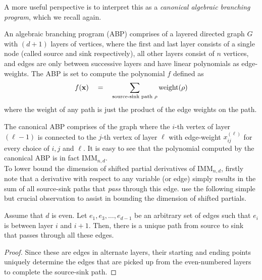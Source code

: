 A more useful perspective is to interpret this as a \emph{canonical algebraic branching program}, which we recall again. 

\begin{definition*}
An algebraic branching program (ABP) comprises of a layered directed graph $G$ with $(d+1)$ layers of vertices, where the first and last layer consists of a single node (called source and sink respectively), all other layers consist of $n$ vertices, and edges are only between successive layers and have linear polynomials as edge-weights. 
The ABP is set to compute the polynomial $f$ defined as
$$
f(\mathbf{x}) \quad = \quad \sum_{\text{source-sink path $\rho$}} \mathrm{weight}(\rho)
$$
where the $\mathrm{weight}$ of any path is just the product of the edge weights on the path. 
\end{definition*}

The canonical ABP comprises of the graph where the $i$-th vertex of layer $(\ell-1)$ is connected to the $j$-th vertex of layer $\ell$ with edge-weight $x_{ij}^{(\ell)}$ for every choice of $i,j$ and $\ell$. 
It is easy to see that the polynomial computed by the canonical ABP is in fact $\mathrm{IMM}_{n,d}$. \\

To lower bound the dimension of shifted partial derivatives of $\mathrm{IMM}_{n,d}$, firstly note that a derivative with respect to any variable (or edge) simply results in the sum of all source-sink paths that \emph{pass} through this edge. \cite{FLMS13} use the following simple but crucial observation to assist in bounding the dimension of shifted partials. 

\begin{observation}\label{obs:odd-layer-unique-path}
Assume that $d$ is even. 
Let $e_1,e_3,\dots, e_{d-1}$ be an arbitrary set of edges such that $e_i$ is between layer $i$ and $i+1$. 
Then, there is a unique path from source to sink that passes through all these edges. 
\end{observation}
\begin{proof}
Since these are edges in alternate layers, their starting and ending points uniquely determine the edges that are picked up from the even-numbered layers to complete the source-sink path.
\end{proof}


